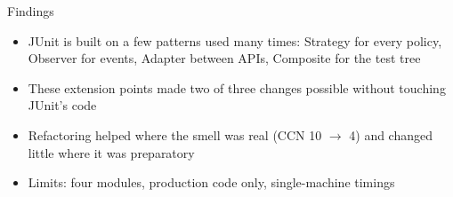 \documentclass[aspectratio=169,11pt]{beamer}
\begin{document}
\begin{frame}{Findings}
\begin{itemize}
\item JUnit is built on a few patterns used many times: Strategy for every policy, Observer for events, Adapter between APIs, Composite for the test tree
\item These extension points made two of three changes possible without touching JUnit's code
\item Refactoring helped where the smell was real (CCN 10 $\to$ 4) and changed little where it was preparatory
\item Limits: four modules, production code only, single-machine timings
\end{itemize}
\end{frame}
\end{document}
